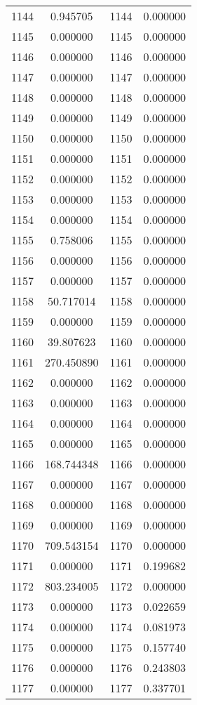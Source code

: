 \documentclass[12pt]{article}
\begin{document}
\begin{longtable}{@{}cccc@{}}
1144 & 0.945705 & 1144 & 0.000000 \\
1145 & 0.000000 & 1145 & 0.000000 \\
1146 & 0.000000 & 1146 & 0.000000 \\
1147 & 0.000000 & 1147 & 0.000000 \\
1148 & 0.000000 & 1148 & 0.000000 \\
1149 & 0.000000 & 1149 & 0.000000 \\
1150 & 0.000000 & 1150 & 0.000000 \\
1151 & 0.000000 & 1151 & 0.000000 \\
1152 & 0.000000 & 1152 & 0.000000 \\
1153 & 0.000000 & 1153 & 0.000000 \\
1154 & 0.000000 & 1154 & 0.000000 \\
1155 & 0.758006 & 1155 & 0.000000 \\
1156 & 0.000000 & 1156 & 0.000000 \\
1157 & 0.000000 & 1157 & 0.000000 \\
1158 & 50.717014 & 1158 & 0.000000 \\
1159 & 0.000000 & 1159 & 0.000000 \\
1160 & 39.807623 & 1160 & 0.000000 \\
1161 & 270.450890 & 1161 & 0.000000 \\
1162 & 0.000000 & 1162 & 0.000000 \\
1163 & 0.000000 & 1163 & 0.000000 \\
1164 & 0.000000 & 1164 & 0.000000 \\
1165 & 0.000000 & 1165 & 0.000000 \\
1166 & 168.744348 & 1166 & 0.000000 \\
1167 & 0.000000 & 1167 & 0.000000 \\
1168 & 0.000000 & 1168 & 0.000000 \\
1169 & 0.000000 & 1169 & 0.000000 \\
1170 & 709.543154 & 1170 & 0.000000 \\
1171 & 0.000000 & 1171 & 0.199682 \\
1172 & 803.234005 & 1172 & 0.000000 \\
1173 & 0.000000 & 1173 & 0.022659 \\
1174 & 0.000000 & 1174 & 0.081973 \\
1175 & 0.000000 & 1175 & 0.157740 \\
1176 & 0.000000 & 1176 & 0.243803 \\
1177 & 0.000000 & 1177 & 0.337701 \\

\end{longtable}
\end{document}
